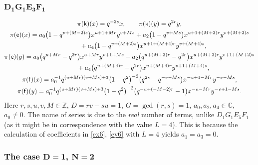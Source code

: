 \documentclass[pdftex]{sigma}
\numberwithin{equation}{section}
\begin{document}
\subsubsection*{$\boldsymbol{D_1G_1E_3F_1}$}
\begin{gather*}
\pi(\mathsf{k})(x)= q^{-2s}x ,\qquad\pi(\mathsf{k})(y)=q^{2r}y ,\\
 \pi(\mathsf{e})(x)= a_0\big(1-q^{v+(M-2)s}\big)x^{u+1+Mr}y^{v+Ms}+ a_2\big(1-q^{v+Ms}\big)x^{u+1+(M+2)r}y^{v+(M+2)s}\\
 \hphantom{\pi(\mathsf{e})(x)=}{}+ a_4\big(1-q^{v+(M+2)s}\big)x^{u+1+(M+4)r}y^{v+(M+4)s} ,\\
\pi(\mathsf{e})(y)= a_0\big(q^{u+Mr}-q^{2r}\big)x^{u+Mr}y^{v+1+Ms}+ a_2\big(q^{u+(M+2)r}-q^{2r}\big)x^{u+(M+2)r}y^{v+1+(M+2)s}\\
\hphantom{\pi(\mathsf{e})(y)=}{}+ a_4\big(q^{u+(M+4)r}-q^{2r}\big)x^{u+(M+4)r}y^{v+1+(M+4)s} ,\\
\pi(\mathsf{f})(x)= a_0^{-1}q^{(u+Mr)(v+Ms)+3}\big(1-q^2\big)^{-2}\big(q^{2s}-q^{-v-Ms}\big)x^{-u+1-Mr}y^{-v-Ms} ,\\
\pi(\mathsf{f})(y)= a_0^{-1}q^{(u+Mr)(v+Ms)+3}\big(1-q^2\big)^{-2}\big(q^{-u+(-M-2)r}-1\big)x^{-u-Mr}y^{-v+1-Ms} .
\end{gather*}
Here $r,s,u,v,M\in\mathbb{Z}$, $D=rv-su=1$, $G=\operatorname{gcd}(r,s)=1$, $a_0,a_2,a_4\in\mathbb{C}$, $a_0\ne 0$. The name of series is due to the {\it real} number of terms, unlike $D_1G_1E_5F_1$ (as it might be in correspondence with the value $L=4$). This is because the calculation of coefficients in \eqref{ex6}, \eqref{ey6} with $L=4$ yields $a_1=a_3=0$.

\subsubsection*{The case $\boldsymbol{D=1}$, $\boldsymbol{N=2}$}
\end{document}

